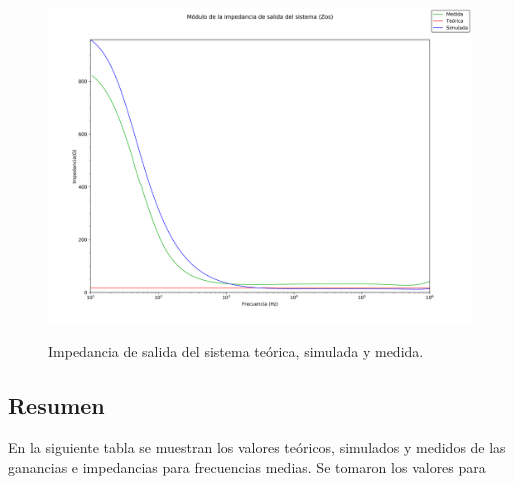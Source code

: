 		\begin{figure}[H]
			\centering
			\includegraphics[scale=0.4]{./Imagenes/Modulo_zos.png} \\
			\caption{Impedancia de salida del sistema teórica, simulada y medida.}
			\label{fig_bode_zout}
		\end{figure}
 
\subsection{Resumen}

En la siguiente tabla se muestran los valores teóricos, simulados y medidos de las ganancias e impedancias para frecuencias medias. Se tomaron los valores para %


